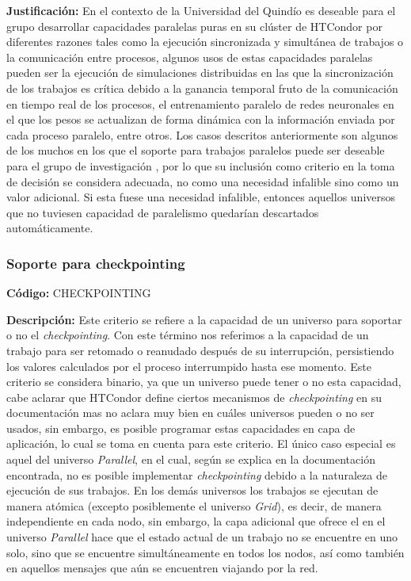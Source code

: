 \textbf{Justificación:} En el contexto de la Universidad del Quindío es deseable para el
grupo \GRID desarrollar capacidades paralelas puras en su clúster de HTCondor por
diferentes razones tales como la ejecución sincronizada y simultánea de trabajos o
la comunicación entre procesos, algunos usos de estas capacidades paralelas
pueden ser la ejecución de simulaciones distribuidas en las que la sincronización de
los trabajos es crítica debido a la ganancia temporal fruto de la comunicación en
tiempo real de los procesos, el entrenamiento paralelo de redes neuronales en el
que los pesos se actualizan de forma dinámica con la información enviada por cada
proceso paralelo, entre otros. Los casos descritos anteriormente son algunos de los
muchos en los que el soporte para trabajos paralelos puede ser deseable para el
grupo de investigación \GRID, por lo que su inclusión como criterio en la toma de
decisión se considera adecuada, no como una necesidad infalible sino como un
valor adicional. Si esta fuese una necesidad infalible, entonces aquellos universos
que no tuviesen capacidad de paralelismo quedarían descartados
automáticamente.

\subsubsection{Soporte para checkpointing}
\textbf{Código:} CHECKPOINTING

\textbf{Descripción:} Este criterio se refiere a la capacidad de un universo para soportar o
no el \textit{checkpointing}. Con este término nos referimos a la capacidad de un trabajo
para ser retomado o reanudado después de su interrupción, persistiendo los valores
calculados por el proceso interrumpido hasta ese momento. Este criterio se
considera binario, ya que un universo puede tener o no esta capacidad, cabe aclarar
que HTCondor define ciertos mecanismos de \textit{checkpointing} en su documentación
mas no aclara muy bien en cuáles universos pueden o no ser usados, sin embargo,
es posible programar estas capacidades en capa de aplicación, lo cual se toma en
cuenta para este criterio. El único caso especial es aquel del universo \textit{Parallel}, en
el cual, según se explica en la documentación encontrada, no es posible
implementar \textit{checkpointing} debido a la naturaleza de ejecución de sus trabajos. En
los demás universos los trabajos se ejecutan de manera atómica (excepto
posiblemente el universo \textit{Grid}), es decir, de manera independiente en cada nodo,
sin embargo, la capa adicional que ofrece el \MPI en el universo \textit{Parallel} hace que
el estado actual de un trabajo no se encuentre en uno solo, sino que se encuentre
simultáneamente en todos los nodos, así como también en aquellos mensajes que
aún se encuentren viajando por la red.


